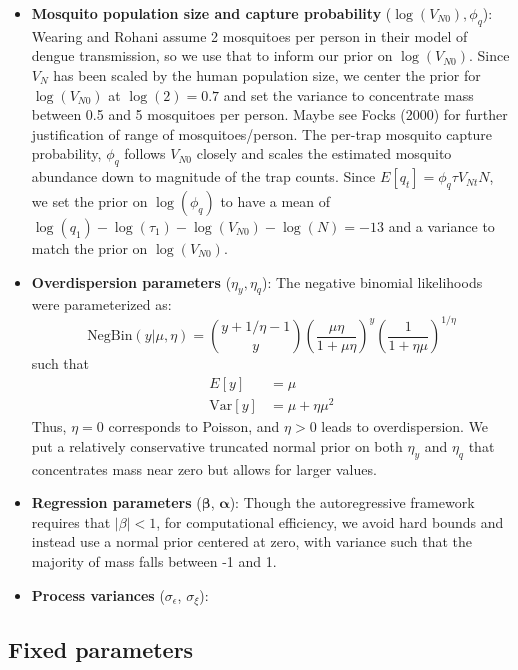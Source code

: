 \documentclass[10pt,letterpaper]{article}
\begin{document}
\begin{itemize}
\\
\item \textbf{Mosquito population size and capture probability} ($\log(V_{N0}), \phi_q$): Wearing and Rohani \cite{Wearing2006} assume 2 mosquitoes per person in their model of dengue transmission, so we use that to inform our prior on $\log(V_{N0})$.
Since $V_{N}$ has been scaled by the human population size, we center the prior for $\log(V_{N0})$ at $\log(2) = 0.7$ and set the variance to concentrate mass between 0.5 and 5 mosquitoes per person.
Maybe see Focks (2000) for further justification of range of mosquitoes/person.
The per-trap mosquito capture probability, $\phi_q$ follows $V_{N0}$ closely and scales the estimated mosquito abundance down to magnitude of the trap counts.
Since $ E[q_t] = \phi_q \tau V_{Nt} N$, we set the prior on $\log(\phi_q)$ to have a mean of $\log(q_1) - \log(\tau_1) - \log(V_{N0}) - \log(N) = -13$ and a variance to match the prior on $\log(V_{N0})$.
\\
\item \textbf{Overdispersion parameters} ($\eta_y, \eta_q$): The negative binomial likelihoods were parameterized as:
\begin{equation}
\text{NegBin}(y | \mu, \eta) = {y + 1/\eta -1 \choose y}\left(\frac{\mu\eta}{1 + \mu\eta}\right)^y\left(\frac{1}{1+\eta\mu}\right)^{1/\eta}
\end{equation}
such that
\begin{align}
E[y] & = \mu\\
\text{Var}[y] &= \mu + \eta\mu^2
\end{align}
Thus, $\eta = 0$ corresponds to Poisson, and $\eta > 0$ leads to overdispersion.
We put a relatively conservative truncated normal prior on both $\eta_y$ and $\eta_q$ that concentrates mass near zero but allows for larger values.
\\
\item \textbf{Regression parameters} ($\mathbf{\beta}$, $\mathbf{\alpha}$): Though the autoregressive framework requires that $|\beta| < 1$, for computational efficiency, we avoid hard bounds and instead use a normal prior centered at zero, with variance such that the majority of mass falls between -1 and 1.
\\
\item \textbf{Process variances} ($\sigma_{\epsilon}$, $\sigma_{\xi}$):
\end{itemize}

\subsection*{Fixed parameters}
\end{document}
